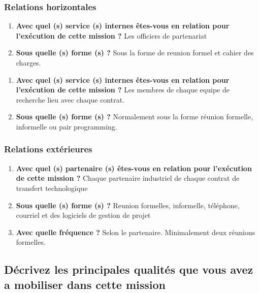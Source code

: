 \documentclass{resume} %
\begin{document}
	\subsubsection {Relations horizontales } 
	
	\begin{enumerate}
		\item \textbf{ Avec quel (s) service (s) internes êtes-vous en relation pour l'exécution de cette mission ?}
			Les officiers de partenariat  
		\item \textbf{Sous quelle (s) forme (s) ?}
			Sous la forme de reunion formel et cahier des charges. 
	\end {enumerate}
	\begin{enumerate}
		\item \textbf{ Avec quel (s) service (s) internes êtes-vous en relation pour l'exécution de cette mission ?}
			Les membres de chaque equipe de recherche lieu avec chaque contrat.
		\item \textbf{Sous quelle (s) forme (s) ?}
			Normalement sous la forme réunion formelle, informelle ou pair programming. 
	\end {enumerate}	

	\subsubsection {Relations extérieures}
		\begin{enumerate}
		\item \textbf{Avec quel (s) partenaire (s) êtes-vous en relation pour l'exécution de cette mission ?}
			Chaque partenaire industriel de chaque contrat de transfert technologique 
		\item \textbf{ Sous quelle (s) forme (s) ?}
			Reunion formelles, informelle, téléphone, courriel et des logiciels de gestion de projet
		\item \textbf{ Avec quelle fréquence ?}
			Selon le partenaire. Minimalement deux réunions formelles. 
		\end {enumerate}			


	\subsection{Décrivez les principales qualités que vous avez a mobiliser dans cette mission}
			
\end{document}
